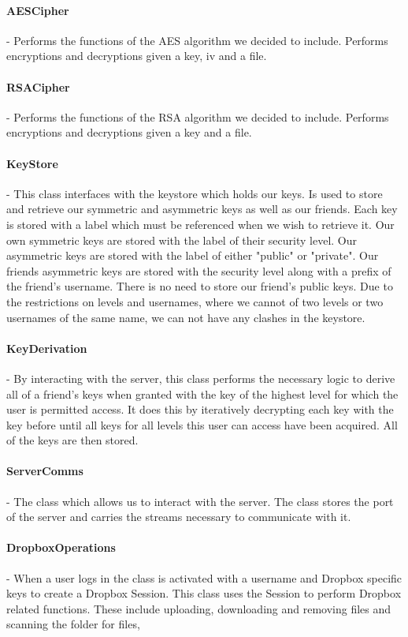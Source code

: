 \documentclass[12pt, titlepage]{article}
\begin{document}
\paragraph*{AESCipher} - Performs the functions of the AES algorithm we decided to include. Performs encryptions and decryptions given a key, iv and a file.
\paragraph*{RSACipher} - Performs the functions of the RSA algorithm we decided to include. Performs encryptions and decryptions given a key and a file.
\paragraph*{KeyStore} - This class interfaces with the keystore which holds our keys. Is used to store and retrieve our symmetric and asymmetric keys as well as our friends. Each key is stored with a label which must be referenced when we wish to retrieve it. Our own symmetric keys are stored with the label of their security level. Our asymmetric keys are stored with the label of either "public" or "private". Our friends asymmetric keys are stored with the security level along with a prefix of the friend's username. There is no need to store our friend's public keys. Due to the restrictions on levels and usernames, where we cannot of two levels or two usernames of the same name, we can not have any clashes in the keystore.
\paragraph*{KeyDerivation} - By interacting with the server, this class performs the necessary logic to derive all of a friend's keys when granted with the key of the highest level for which the user is permitted access. It does this by iteratively decrypting each key with the key before until all keys for all levels this user can access have been acquired. All of the keys are then stored.
\paragraph*{ServerComms} - The class which allows us to interact with the server. The class stores the port of the server and carries the streams necessary to communicate with it.
\paragraph*{DropboxOperations} - When a user logs in the class is activated with a username and Dropbox specific keys to create a Dropbox Session. This class uses the Session to perform Dropbox related functions. These include uploading, downloading and removing files and  scanning the folder for files, 
\end{document}

